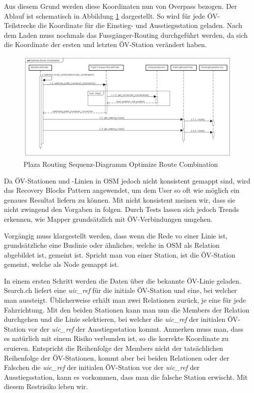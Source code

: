 Aus diesem Grund werden diese Koordinaten nun von Overpass \cite{wiki:overpass} bezogen. Der Ablauf ist schematisch in Abbildung \ref{fig:sequence_diagram_plaza_routing_optimize_route_comb} dargestellt. So wird für jede ÖV-Teilstrecke die Koordinate für die Einstieg- und Ausstiegsstation geladen. Nach dem Laden muss nochmals das Fussgänger-Routing durchgeführt werden, da sich die Koordinate der ersten und letzten ÖV-Station verändert haben.

\begin{figure}[ht]
\centering
\includegraphics[width=1\linewidth]{projectdoc/img/sequence_diagram_plaza_routing_optimize_route_comb}
\caption[Plaza Routing Sequenz-Diagramm Optimize Route Combination]{Plaza Routing Sequenz-Diagramm Optimize Route Combination}
\label{fig:sequence_diagram_plaza_routing_optimize_route_comb}
\end{figure}

Da ÖV-Stationen und -Linien in \ac{OSM} jedoch nicht konsistent gemappt sind, wird das Recovery Blocks Pattern \cite{fault_tolerant_software} angewendet, um dem User so oft wie möglich ein genaues Resultat liefern zu können. Mit nicht konsistent meinen wir, dass sie nicht zwingend den Vorgaben in \cite{osm_wiki_relation} folgen. Durch Tests lassen sich jedoch Trends erkennen, wie Mapper grundsätzlich mit ÖV-Verbindungen umgehen.

Vorgängig muss klargestellt werden, dass wenn die Rede vo einer Linie ist, grundsätzliche eine Buslinie oder ähnliches, welche in \ac{OSM} als Relation \cite{osm_wiki_relation} abgebildet ist, gemeint ist. Spricht man von einer Station, ist die ÖV-Station gemeint, welche als Node gemappt ist.

In einem ersten Schritt werden die Daten über die bekannte ÖV-Linie geladen. Search.ch \cite{search_ch_route_api} liefert eine \emph{uic\_ref} für die initiale ÖV-Station und eine, bei welcher man aussteigt. Üblicherweise erhält man zwei Relationen zurück, je eine für jede Fahrrichtung. Mit den beiden Stationen kann man nun die Members der Relation durchgehen und die Linie selektieren, bei welcher die \emph{uic\_ref} der initialen ÖV-Station vor der \emph{uic\_ref} der Ausstiegsstation kommt.
Anmerken muss man, dass es natürlich mit einem Risiko verbunden ist, so die korrekte Koordinate zu eruieren. Entspricht die Reihenfolge der Members nicht der tatsächlichen Reihenfolge der ÖV-Stationen, kommt aber bei beiden Relationen oder der Falschen die \emph{uic\_ref} der initialen ÖV-Station vor der \emph{uic\_ref} der Ausstiegsstation, kann es vorkommen, dass man die falsche Station erwischt. Mit diesem Restrisiko leben wir.

